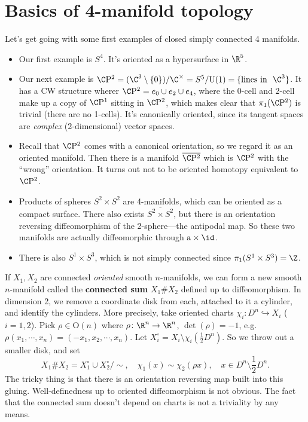 \section{Basics of 4-manifold topology} 
\begin{example}
Let's get going with some first examples of closed simply connected 4 manifolds.
\begin{itemize}
\setlength\itemsep{-.2em}
    \item Our first example is $S^4$. It's oriented as a hypersurface in $\R^5$.
    \item Our next example is $\C\mathrm{P}^2 = (\C^3 \setminus \{0\} ) / \C^{\times }= S^5 / \mathrm{U}(1)= \{\text{lines in } \ \C^3\} $. It has a CW structure wherer $\C \mathrm{P}^2 = e_0 \cup  e_2 \cup  e_4$, where the 0-cell and 2-cell make up a copy of $\C\mathrm{P}^1$ sitting in $\C \mathrm{P}^2$, which makes clear that $\pi_1(\C \mathrm{P}^2)$ is trivial (there are no 1-cells). It's canonically oriented, since its tangent spaces are \emph{complex} (2-dimensional) vector spaces.
    \item Recall that $\C \mathrm{P}^2$ comes with a canonical orientation, so we regard it as an oriented manifold. Then there is a manifold $\overline{\C \mathrm{P}^2}$ which is $\C\mathrm{P}^2$ with the ``wrong'' orientation. It turns out not to be oriented homotopy equivalent to $\C \mathrm{P}^2$.
    \item Products of spheres $S^2 \times S^2$ are 4-manifolds, which can be oriented as a compact surface. There also exists $\overline{S^2 \times S^2}$, but there is an orientation reversing diffeomorphism of the 2-sphere---the antipodal map. So these two manifolds are actually diffeomorphic through $\mathrm{a} \times  \id$.
    \item There is also $S^1  \times S^3$, which is not simply connected since $\pi_1(S^1  \times  S^3) = \Z$.
\end{itemize}
If $X_1,X_2$ are connected \emph{oriented} smooth $n$-manifolds, we can form a new smooth $n$-manifold called the \textbf{connected sum} $X_1 \# X_2$ defined up to diffeomorphism. In dimension 2, we remove a coordinate disk from each, attached to it a cylinder, and identify the cylinders. More precisely, take oriented charts $\chi_i\colon D^n  \hookrightarrow  X_i $ ($i=1,2$). Pick $\rho \in \mathrm{O}(n)$ where $\rho \colon \R^n  \to \R^n $, $\det(\rho) = -1$, e.g. $\rho(x_1, \cdots ,x_n ) = (-x_1, x_2, \cdots ,x_n )$. Let $X_i  ^{\circ}= X_i  \setminus \chi_i( \frac{1}{2}D^n ).$ So we throw out a smaller disk, and set \[
    X_1 \# X_2 = X_1 ^{\circ }\cup  X_2 ^{\circ } / \sim, \quad \chi_1(x) \sim \chi_2(\rho x),\quad x \in D^n  \setminus \frac{1}{2}D^n .
\] The tricky thing is that there is an orientation reversing map built into this gluing. Well-definedness up to oriented diffeomorphism is not obvious. The fact that the connected sum doesn't depend on charts is not a triviality by any means.
\end{example}

